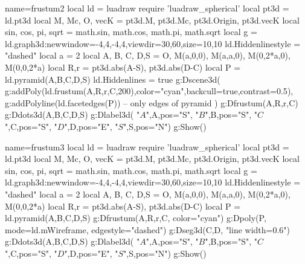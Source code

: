 \documentclass[12pt]{standalone}
\begin{document}
\begin{luadraw}{name=frustum2}
local ld = luadraw
require 'luadraw_spherical'
local pt3d = ld.pt3d
local M, Mc, O, vecK = pt3d.M, pt3d.Mc, pt3d.Origin,  pt3d.vecK
local sin, cos, pi, sqrt = math.sin, math.cos, math.pi, math.sqrt
local g = ld.graph3d:new{window={-4,4,-4,4},viewdir={30,60},size={10,10}}
ld.Hiddenlinestyle = "dashed"
local a = 2
local A, B, C, D,S = O, M(a,0,0), M(a,a,0), M(0,2*a,0), M(0,0,2*a)
local R,r =  pt3d.abs(A-S),  pt3d.abs(D-C)
local P = ld.pyramid({A,B,C,D},S)
ld.Hiddenlines = true 
g:Dscene3d(
   g:addPoly(ld.frustum(A,R,r,C,200),{color="cyan",backcull=true,contrast=0.5}),
    g:addPolyline(ld.facetedges(P)) -- only edges of pyramid
)
g:Dfrustum(A,R,r,C)
g:Ddots3d({A,B,C,D,S})
g:Dlabel3d( "$A$",A,{pos="S"}, "$B$",B,{pos="S"}, "$C$",C,{pos="S"}, "$D$",D,{pos="E"}, "$S$",S,{pos="N"})
g:Show()
\end{luadraw}

\begin{luadraw}{name=frustum3}
local ld = luadraw
require 'luadraw_spherical'
local pt3d = ld.pt3d
local M, Mc, O, vecK = pt3d.M, pt3d.Mc, pt3d.Origin,  pt3d.vecK
local sin, cos, pi, sqrt = math.sin, math.cos, math.pi, math.sqrt
local g = ld.graph3d:new{window={-4,4,-4,4},viewdir={30,60},size={10,10}}
ld.Hiddenlinestyle = "dashed"
local a = 2
local A, B, C, D,S = O, M(a,0,0), M(a,a,0), M(0,2*a,0), M(0,0,2*a)
local R,r =  pt3d.abs(A-S),  pt3d.abs(D-C)
local P = ld.pyramid({A,B,C,D},S)
g:Dfrustum(A,R,r,C, {color="cyan"})
g:Dpoly(P, {mode=ld.mWireframe, edgestyle="dashed"})
g:Dseg3d({C,D}, "line width=0.6")
g:Ddots3d({A,B,C,D,S})
g:Dlabel3d( "$A$",A,{pos="S"}, "$B$",B,{pos="S"}, "$C$",C,{pos="S"}, "$D$",D,{pos="E"}, "$S$",S,{pos="N"})
g:Show()
\end{luadraw}
\end{document}
